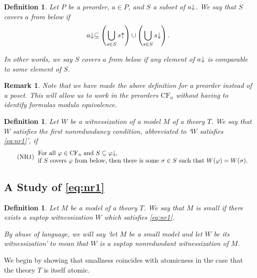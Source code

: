 \documentclass{article}
\newtheorem{remark}[theorem]{Remark}
\newtheorem{definition}[theorem]{Definition}
\theoremstyle{nonumberplain}
\newcommand{\CF}{\mathrm{CF}}
\newcommand{\upcl}[1]{{#1}\hspace{-0.25em}\uparrow}
\newcommand{\dncl}[1]{{#1}\hspace{-0.25em}\downarrow}
\begin{document}
\begin{definition}
Let $P$ be a preorder, $a \in P$, and $S$ a subset of $\dncl a$. We say that $S$ covers $a$ from below if
\begin{equation}
\dncl a \subseteq \left( \bigcup_{s \in S} \upcl s \right) \cup \left( \bigcup_{s \in S} \dncl s \right).
\end{equation}

In other words, we say $S$ covers $a$ from below if any element of $\dncl a$ is comparable to some element of $S$.
\end{definition}

\begin{remark}
Note that we have made the above definition for a preorder instead of a poset. This will allow us to work in the preorders $\CF_n$ without having to identify formulas modulo equivalence.
\end{remark}

\begin{definition}
Let $W$ be a witnessization of a model $M$ of a theory $T$. We say that $W$ satisfies the \emph{first nonredundancy condition}, abbreviated to `$W$ satisfies \eqref{eq:nr1}', if
\begin{equation}
\tag{NR1}\label{eq:nr1}
\begin{tabular}{l}
For all $\varphi \in \CF_n$ and $S \subseteq \dncl\varphi$,\\
if $S$ covers $\varphi$ from below, then there is some $\sigma \in S$ such that $W(\varphi) = W(\sigma)$.
\end{tabular}
\end{equation}
\end{definition}

\subsection{A Study of \eqref{eq:nr1}}

\begin{definition}
Let $M$ be a model of a theory $T$. We say that $M$ is \emph{small} if there exists a suptop witnessization $W$ which satisfies \eqref{eq:nr1}.

By abuse of language, we will say `let $M$ be a small model and let $W$ be its witnessization' to mean that $W$ is a suptop nonredundant witnessization of $M$.
\end{definition}

We begin by showing that smallness coincides with atomicness in the case that the theory $T$ is itself atomic.
\end{document}
